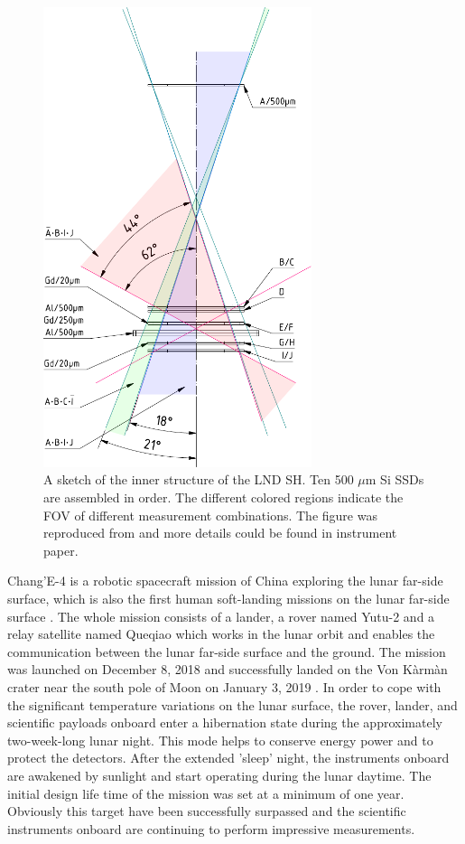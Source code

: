 \begin{figure}[!htb]
    \centering
    \includegraphics[width = 0.7\textwidth, height = 0.5 \textheight]{images/change4_lnd-c9_trigger-cones-colored.pdf}
    \caption[The inner structure of LND \ac{SH}]{A sketch of the inner structure of the \ac{LND} \ac{SH}. Ten 500 $\mu$m Si \acp{SSD} are assembled in order. The different colored regions indicate the \ac{FOV} of different measurement combinations. The figure was reproduced from \citet{Wimmer-2020-LND} and more details could be found in instrument paper.}
    \label{Fig:LND_sensor_head}
\end{figure}
Chang'E-4 is a robotic spacecraft mission of China exploring the lunar far-side surface, which is also the first human soft-landing missions on the lunar far-side surface \citep{Li2021SSRv}. The whole mission consists of a lander, a rover named Yutu-2 and a relay satellite named Queqiao which works in the lunar orbit and enables the communication between the lunar far-side surface and the ground. The mission was launched on December 8, 2018 and successfully landed on the Von K\`arm\`an crater near the south pole of Moon on January 3, 2019 \citep{Wu2019NatGe}. In order to cope with the significant temperature variations on the lunar surface, the rover, lander, and scientific payloads onboard enter a hibernation state during the approximately two-week-long lunar night. This mode helps to conserve energy power and to protect the detectors.  After the extended 'sleep' night, the instruments onboard are awakened by sunlight and start operating during the lunar daytime. The initial design life time of the mission was set at a minimum of one year. Obviously this target have been successfully surpassed and the scientific instruments onboard are continuing to perform impressive measurements.

